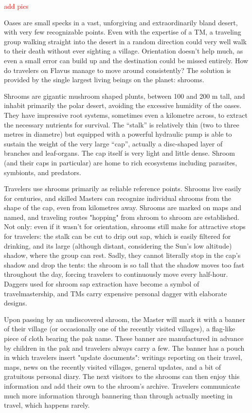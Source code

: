 \documentclass[10pt,oneside]{memoir}
\newcommand{\cmmnt}[1]{\textcolor{red}{#1}}
\begin{document}
\cmmnt{add pics}

Oases are small specks in a vast, unforgiving and extraordinarily bland desert, with very few recognizable points. Even with the expertise of a TM, a traveling group walking straight into the desert in a random direction could very well walk to their death without ever sighting a village. Orientation doesn't help much, as even a small error can build up and the destination could be missed entirely. How do travelers on Flavus manage to move around consistently? The solution is provided by the single largest living beings on the planet: shrooms.

Shrooms are gigantic mushroom shaped plunts, between 100 and 200 m tall, and inhabit primarily the polar desert, avoiding the excessive humidity of the oases. They have impressive root systems, sometimes even a kilometre across, to extract the necessary nutrients for survival. The ``stalk'' is relatively thin (two to three metres in diametre) but equipped with a powerful hydraulic pump is able to sustain the weight of the very large ``cap'', actually a disc-shaped layer of branches and leaf-organs. The cap itself is very light and little dense. Shroom (and their caps in particular) are home to rich ecosystems including parasites, symbionts, and predators.

Travelers use shrooms primarily as reliable reference points. Shrooms live easily for centuries, and skilled Masters can recognize individual shrooms from the shape of the cap, even from kilometres away. Shrooms are marked on maps and named, and traveling routes "hopping" from shroom to shroom are established. Not only: even if it wasn't for orientation, shrooms still make for attractive stops for travelers: the stalk can be cut to drip out sap, which is easily filtered for drinking, and its large (although distant, considering the Sun's low altitude) shadow, where the group can rest. Sadly, they cannot literally stop in the cap's shadow and drop the tents: the shroom is so tall that the shadow moves too fast throughout the day, forcing travelers to continuously move every half-hour. Daggers used for shroom sap extraction have become a symbol of travelmastership, and TMs carry expensive personal dagger with elaborate designs.

Upon passing by an undiscovered shroom, the Master will mark it with a banner of their village (or occasionally one of the recently visited villages), a flag-like piece of cloth bearing the pak name. These banner are manufactured in advance by children in the pak and travelers always carry a few. The banner has a pouch in which travelers insert "update documents": writings reporting on their travel, maps, news on the recently visited villages, general updates, and a bit of gratuitous personal diary. The next visitors to the shrooms can then enjoy this information and add their own to the shroom's archive. Travelers communicate much more information through bannering than through actually meeting in travel, which happens rarely.
\end{document}
